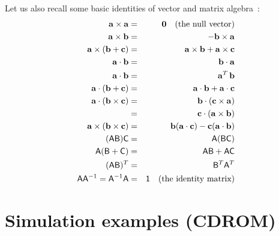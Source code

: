 Let us also recall some basic identities of vector and matrix algebra~\cite{RHB:02}:
\begin{eqnarray*}
\ve{a}\times\ve{a} & = & \ve{0}\quad\mathrm{(the~null~vector)} \\
\ve{a}\times\ve{b} & = & -\ve{b}\times\ve{a} \\
\ve{a}\times(\ve{b} + \ve{c}) & = & \ve{a}\times\ve{b} + \ve{a}\times\ve{c} \\
\ve{a}\cdot\ve{b} & = & \ve{b}\cdot\ve{a} \\
\ve{a}\cdot\ve{b} & = & \ve{a}^T\,\ve{b} \\
\ve{a}\cdot(\ve{b} + \ve{c}) & = & \ve{a}\cdot\ve{b} + \ve{a}\cdot\ve{c} \\
\ve{a}\cdot(\ve{b}\times\ve{c}) & = & \ve{b}\cdot(\ve{c}\times\ve{a}) \\
    & = & \ve{c}\cdot(\ve{a}\times\ve{b}) \\
\ve{a}\times(\ve{b}\times\ve{c}) & = &
    \ve{b}(\ve{a}\cdot\ve{c}) - \ve{c}(\ve{a}\cdot\ve{b}) \\
(\m{A}\m{B})\m{C} & = & \m{A}(\m{B}\m{C}) \\
\m{A}(\m{B} + \m{C}) & = & \m{A}\m{B} + \m{A}\m{C} \\
(\m{A}\m{B})^T & = & \m{B}^T\m{A}^T \\
\m{A}\m{A}^{-1} = \m{A}^{-1}\m{A} & = & \m{1}\quad\mathrm{(the~identity~matrix)}
\end{eqnarray*}


\chapter{Simulation examples (CDROM)\label{cdrom}}
